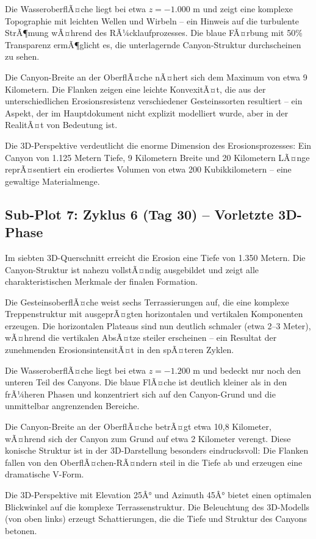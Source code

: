﻿\documentclass[12pt,a4paper]{report}
\begin{document}
Die WasseroberflÃ¤che liegt bei etwa $z = -1.000$ m und zeigt eine komplexe Topographie mit leichten Wellen und Wirbeln -- ein Hinweis auf die turbulente StrÃ¶mung wÃ¤hrend des RÃ¼cklaufprozesses. Die blaue FÃ¤rbung mit 50\% Transparenz ermÃ¶glicht es, die unterlagernde Canyon-Struktur durchscheinen zu sehen.

Die Canyon-Breite an der OberflÃ¤che nÃ¤hert sich dem Maximum von etwa 9 Kilometern. Die Flanken zeigen eine leichte KonvexitÃ¤t, die aus der unterschiedlichen Erosionsresistenz verschiedener Gesteinssorten resultiert -- ein Aspekt, der im Hauptdokument nicht explizit modelliert wurde, aber in der RealitÃ¤t von Bedeutung ist.

Die 3D-Perspektive verdeutlicht die enorme Dimension des Erosionsprozesses: Ein Canyon von 1.125 Metern Tiefe, 9 Kilometern Breite und 20 Kilometern LÃ¤nge reprÃ¤sentiert ein erodiertes Volumen von etwa 200 Kubikkilometern -- eine gewaltige Materialmenge.

\subsection{Sub-Plot 7: Zyklus 6 (Tag 30) -- Vorletzte 3D-Phase}

Im siebten 3D-Querschnitt erreicht die Erosion eine Tiefe von 1.350 Metern. Die Canyon-Struktur ist nahezu vollstÃ¤ndig ausgebildet und zeigt alle charakteristischen Merkmale der finalen Formation.

Die GesteinsoberflÃ¤che weist sechs Terrassierungen auf, die eine komplexe Treppenstruktur mit ausgeprÃ¤gten horizontalen und vertikalen Komponenten erzeugen. Die horizontalen Plateaus sind nun deutlich schmaler (etwa 2--3 Meter), wÃ¤hrend die vertikalen AbsÃ¤tze steiler erscheinen -- ein Resultat der zunehmenden ErosionsintensitÃ¤t in den spÃ¤teren Zyklen.

Die WasseroberflÃ¤che liegt bei etwa $z = -1.200$ m und bedeckt nur noch den unteren Teil des Canyons. Die blaue FlÃ¤che ist deutlich kleiner als in den frÃ¼heren Phasen und konzentriert sich auf den Canyon-Grund und die unmittelbar angrenzenden Bereiche.

Die Canyon-Breite an der OberflÃ¤che betrÃ¤gt etwa 10,8 Kilometer, wÃ¤hrend sich der Canyon zum Grund auf etwa 2 Kilometer verengt. Diese konische Struktur ist in der 3D-Darstellung besonders eindrucksvoll: Die Flanken fallen von den OberflÃ¤chen-RÃ¤ndern steil in die Tiefe ab und erzeugen eine dramatische V-Form.

Die 3D-Perspektive mit Elevation 25Â° und Azimuth 45Â° bietet einen optimalen Blickwinkel auf die komplexe Terrassenstruktur. Die Beleuchtung des 3D-Modells (von oben links) erzeugt Schattierungen, die die Tiefe und Struktur des Canyons betonen.
\end{document}
